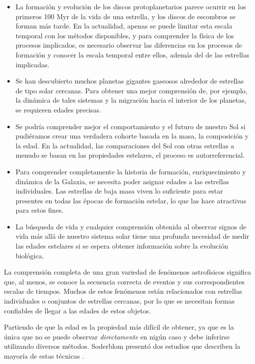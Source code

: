 \begin{itemize}
\item La formación y evolución de los discos protoplanetarios parece ocurrir en los primeros 100 Myr de la vida de una estrella, y los discos de escombros se forman más tarde. En la actualidad, apenas se puede limitar esta escala temporal con los métodos disponibles, y para comprender la física de los procesos implicados, es necesario observar las diferencias en los procesos de formación y conocer la escala temporal entre ellos, además del de las estrellas implicadas.
\item Se han descubierto muchos planetas gigantes gaseosos alrededor de estrellas de tipo solar cercanas. Para obtener una mejor comprensión de, por ejemplo, la dinámica de tales sistemas y la migración hacia el interior de los planetas, se requieren edades precisas.
\item Se podría comprender mejor el comportamiento y el futuro de nuestro Sol si pudiéramos crear una verdadera cohorte basada en la masa, la composición y la edad. En la actualidad, las comparaciones del Sol con otras estrellas a menudo se basan en las propiedades estelares, el proceso es autorreferencial.
\item Para comprender completamente la historia de formación, enriquecimiento y dinámica de la Galaxia, se necesita poder asignar edades a las estrellas individuales. Las estrellas de baja masa viven lo suficiente para estar presentes en todas las épocas de formación estelar, lo que las hace atractivas para estos fines.
\item La búsqueda de vida y cualquier comprensión obtenida al observar signos de vida más allá de nuestro sistema solar tiene una profunda necesidad de medir las edades estelares si se espera obtener información sobre la evolución biológica.
\end{itemize}

La comprensión completa de una gran variedad de fenómenos astrofísicos significa que, al menos, se conoce la secuencia correcta de eventos y sus correspondientes escalas de tiempos. Muchos de estos fenómenos están relacionados con estrellas individuales o conjuntos de estrellas cercanas, por lo que se necesitan formas confiables de llegar a las edades de estos objetos.

Partiendo de que la edad es la propiedad más difícil de obtener, ya que es la única que no se puede observar \emph{directamente} en nigún caso y debe inferirse utilizando diversos métodos. Soderblom presentó dos estudios que describen la mayoría de estas técnicas \cite{Soderblom15, Soderblom10}.


